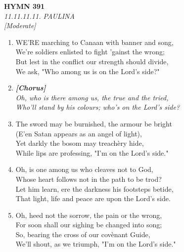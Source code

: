 \documentclass[11pt,a4paper]{article}
\begin{document}
\newpage
\begin{center}
    {\Large \textbf{HYMN 391}}
    \\
    \textit{11.11.11.11. PAULINA}
    \\
    \textit{\small [Moderate]}
\end{center}
\vspace{1em}

\begin{enumerate}
    \item WE'RE marching to Canaan with banner and song, \\
        We're soldiers enlisted to fight 'gainst the wrong; \\
        But lest in the conflict our strength should divide, \\
        We ask, "Who among us is on the Lord's side?"

    \item[] \vspace{0.4em}
    \textbf{\textit{[Chorus]}} \\
    \textit{Oh, who is there among us, the true and the tried,} \\
    \textit{Who'll stand by his colours; who's on the Lord's side?}
    \vspace{0.4em}

    \item The sword may be burnished, the armour be bright \\
        (E'en Satan appears as an angel of light), \\
        Yet darkly the bosom may treach\`ery hide, \\
        While lips are professing, "I'm on the Lord's side."

    \item Oh, is one among us who cleaves not to God, \\
        Whose heart follows not in the path to be trod? \\
        Let him learn, ere the darkness his footsteps betide, \\
        That light, life and peace are upon the Lord's side.

    \item Oh, heed not the sorrow, the pain or the wrong, \\
        For soon shall our sighing be changed into song; \\
        So, bearing the cross of our cov\`enant Guide, \\
        We'll shout, as we triumph, "I'm on the Lord's side."

\end{enumerate}
\end{document}
